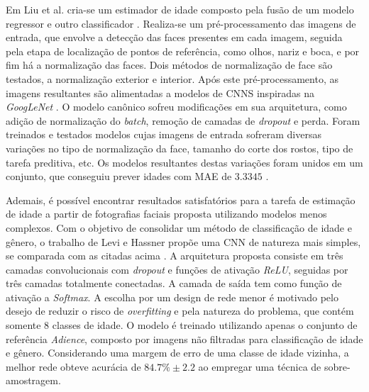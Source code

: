 Em  Liu et al. cria-se um estimador de idade composto pela fusão de um modelo regressor e outro classificador \cite{liu2015agenet}. Realiza-se um pré-processamento das imagens de entrada, que envolve a detecção das faces presentes em cada imagem, seguida pela etapa de localização de pontos de referência, como olhos, nariz e boca, e por fim há a normalização das faces. Dois métodos de normalização de face são testados, a normalização exterior e interior. Após este pré-processamento, as imagens resultantes são alimentadas a modelos de CNNS inspiradas na \emph{GoogLeNet} \cite{inception}. O modelo canônico sofreu modificações em sua arquitetura, como adição de normalização do \emph{batch}, remoção de camadas de \emph{dropout} e perda. Foram treinados e testados modelos cujas imagens de entrada sofreram diversas variações no tipo de normalização da face, tamanho do corte dos rostos, tipo de tarefa preditiva, etc. Os modelos resultantes destas variações foram unidos em um conjunto, que conseguiu prever idades com MAE de $3.3345$ \cite{liu2015agenet}.

Ademais, é possível encontrar resultados satisfatórios para a tarefa de estimação de idade a partir de fotografias faciais proposta utilizando modelos menos complexos. Com o objetivo de consolidar um método de classificação de idade e gênero, o trabalho de Levi e Hassner  propõe uma CNN de natureza mais simples, se comparada com as citadas acima \cite{levi2015age}. A arquitetura proposta consiste em três camadas convolucionais com \emph{dropout} e funções de ativação \emph{ReLU}, seguidas por três camadas totalmente conectadas. A camada de saída tem como função de ativação a  \emph{Softmax}. A escolha por um design de rede menor é motivado pelo desejo de reduzir o risco de \emph{overfitting} e pela natureza do problema, que contém somente 8 classes de idade. O modelo é treinado utilizando apenas o conjunto de referência \emph{Adience}, composto por imagens não filtradas para classificação de idade e gênero. Considerando uma margem de erro de uma classe de idade vizinha, a melhor rede obteve acurácia de $84.7\% \pm 2.2$ ao empregar uma técnica de sobre-amostragem.
